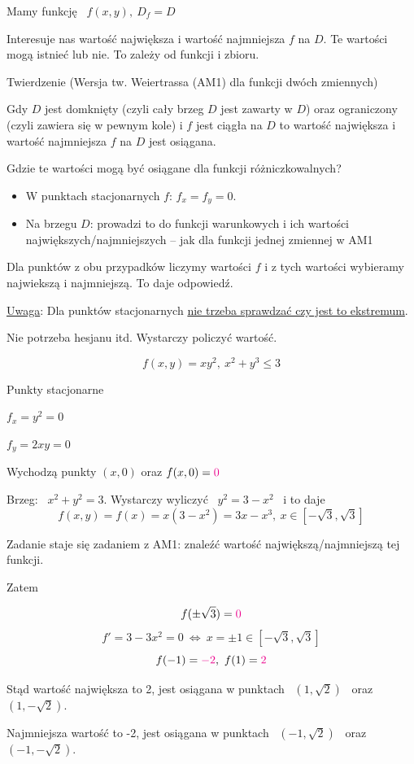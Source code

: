 Mamy funkcję \ $ f(x,y), \ D_f = D $

Interesuje nas wartość największa i wartość najmniejsza $f$ na $D$. Te wartości mogą istnieć lub nie. To zależy od funkcji i zbioru.
\bigskip

\begin{tw}{Twierdzenie (Wersja tw. Weiertrassa (AM1) dla funkcji dwóch zmiennych)}

Gdy $D$ jest domknięty (czyli cały brzeg $D$ jest zawarty w $D$) oraz ograniczony (czyli zawiera się w pewnym kole) i $f$ jest ciągła
na $D$ to wartość największa i wartość najmniejsza $f$ na $D$ jest osiągana.
\end{tw}
\bigskip

Gdzie te wartości mogą być osiągane dla funkcji różniczkowalnych?
\begin{itemize}
    \item W punktach stacjonarnych $f$: $ f_x = f_y = 0 $.
    \item Na brzegu $D$: prowadzi to do funkcji warunkowych i ich wartości największych/najmniejszych -- jak dla funkcji jednej zmiennej w AM1
\end{itemize}
\bigskip

Dla punktów z obu przypadków liczymy wartości $f$ i z tych wartości wybieramy najwiekszą i najmniejszą. To daje odpowiedź.

\underline{Uwaga}: Dla punktów stacjonarnych \underline{nie trzeba sprawdzać czy jest to ekstremum}.

Nie potrzeba hesjanu itd. Wystarczy policzyć wartość.
\bigskip

\begin{przyklad}
\[ f(x,y) = xy^2, \ x^2 + y^3 \leq 3 \]

Punkty stacjonarne

$ f_x = y^2 = 0 $

$ f_y = 2xy = 0 $

Wychodzą punkty $ (x, 0) $ oraz $ f(x,0) = \textcolor{magenta}{0} $

Brzeg: \ $ x^2 + y^2 = 3 $. Wystarczy wyliczyć \ $ y^2 = 3 - x^2 $ \ i to daje
\[f(x,y) = f(x) = x(3-x^2) = 3x - x^3, \ x\in \left[-\sqrt3, \sqrt3 \right] \]

Zadanie staje się zadaniem z AM1: znaleźć wartość największą/najmniejszą tej funkcji.

Zatem

\[ f(\pm \sqrt3) = \textcolor{magenta}{0} \]
\[ f' = 3 - 3x^2 = 0 \ \Leftrightarrow \ x = \pm 1 \in \left[ -\sqrt3, \sqrt3 \right] \]
\[ f(-1) = \textcolor{magenta}{-2}, \ f(1) = \textcolor{magenta}{2} \]

Stąd wartość największa to 2, jest osiągana w punktach \ $(1, \sqrt2) $ \ oraz \ $ (1, -\sqrt2) $.

Najmniejsza wartość to -2, jest osiągana w punktach \ $(-1, \sqrt2) $ \ oraz \ $(-1, -\sqrt2) $.
\end{przyklad}


